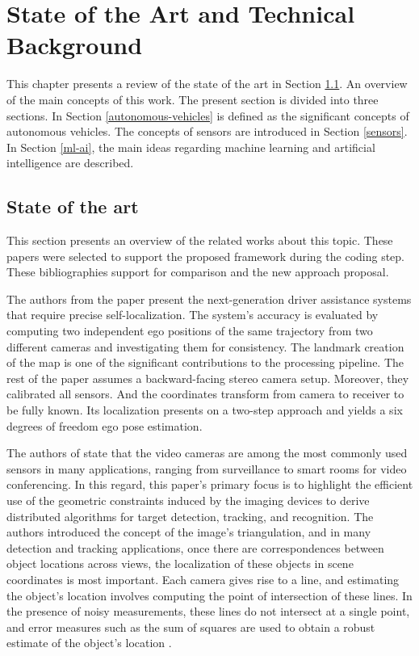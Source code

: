 \chapter{State of the Art and Technical Background}
\label{capitulo3}

This chapter presents a review of the state of the art in Section \ref{capitulo2}.  An overview of the main concepts of this work. The present section is divided into three sections. In Section \ref{autonomous-vehicles} is defined as the significant concepts of autonomous vehicles. The concepts of sensors are introduced in Section \ref{sensors}. In Section \ref{ml-ai}, the main ideas regarding machine learning and artificial intelligence are described.

\section{State of the art} \label{capitulo2}

This section presents an overview of the related works about this topic. These papers were selected to support the proposed framework during the coding step. These bibliographies support for comparison and the new approach proposal. 

The authors from the paper \cite{Lategahn2013} present the next-generation driver assistance systems that require precise self-localization. The system's accuracy is evaluated by computing two independent ego positions of the same trajectory from two different cameras and investigating them for consistency. The landmark creation of the map is one of the significant contributions to the processing pipeline. The rest of the paper assumes a backward-facing stereo camera setup. Moreover, they calibrated all sensors. And the coordinates transform from camera to receiver to be fully known. Its localization presents on a two-step approach and yields a six degrees of freedom ego pose estimation.

The authors of \cite{Sankaranarayanan2008} state that the video cameras are among the most commonly used sensors in many applications, ranging from surveillance to smart rooms for video conferencing. In this regard, this paper's primary focus is to highlight the efficient use of the geometric constraints induced by the imaging devices to derive distributed algorithms for target detection, tracking, and recognition. The authors introduced the concept of the image's triangulation, and in many detection and tracking applications, once there are correspondences between object locations across views, the localization of these objects in scene coordinates is most important. Each camera gives rise to a line, and estimating the object's location involves computing the point of intersection of these lines. In the presence of noisy measurements, these lines do not intersect at a single point, and error measures such as the sum of squares are used to obtain a robust estimate of the object's location \cite{hartley1997triangulation}.

